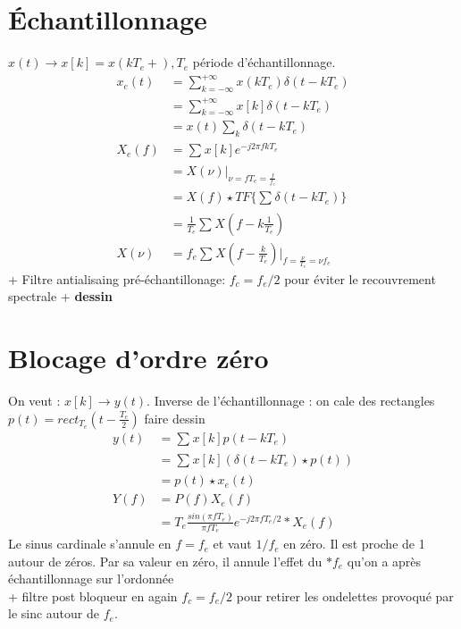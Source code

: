 \documentclass{article}
\begin{document}
\begin{multicols}{2}
    \section{Échantillonnage}
    $ x(t) \to x[k] = x(kT_e+), T_e $  période d'échantillonnage. \\
    \begin{align*}
        x_e(t)  &= \sum_{k=-\infty }^{+\infty }x(kT_e)\delta (t - kT_e) \\
                &= \sum_{k=-\infty }^{+\infty }x[k]\delta (t - kT_e) \\
                &= x(t) \sum_{k}^{}\delta (t - kT_e)\\
        X_e(f)  &= \sum_{}^{} x[k] e^{- j 2 \pi fkT_e} \\
                &= X(\nu ) \vert _{\nu = fT_e = \frac{f}{f_e}} \\
                &= X(f) \star TF\{\sum_{}^{} \delta (t - kT_e)\} \\
                &= \frac{1}{T_e} \sum_{}^{}X(f - k \frac{1}{T_e}) \\
        X(\nu ) &= f_e \sum_{}^{}X(f - \frac{k}{T_e}) \vert _{f = \frac{\nu}{T_e} = \nu f_e}
    \end{align*}
    + Filtre antialisaing pré-échantillonage: $ f_c = f_e / 2 $ pour éviter le recouvrement spectrale + \textbf{dessin}
    
    \section{Blocage d'ordre zéro}
    On veut : $ x[k] \to y(t) $. Inverse de l'échantillonnage : on cale des rectangles $ p(t) = rect_{T_e} (t - \frac{T_e}{2}) $ faire dessin
    \begin{align*}
        y(t)&= \sum_{}^{}x[k]p(t - kT_e) \\
            &= \sum_{}^{}x[k](\delta (t - kT_e) \star p(t)) \\
            &= p(t) \star x_e(t) \\
        Y(f)&= P(f)X_e(f) \\
            &= T_e \frac{sin(\pi f T_e)}{\pi f T_e} e^{-j 2 \pi f T_e/2} * X_e(f)
    \end{align*}
    Le sinus cardinale s'annule en $ f = f_e $ et vaut $ 1/f_e $ en zéro. Il est proche de 1 autour de zéros. Par sa valeur en zéro, il annule l'effet du $ *f_e $ qu'on a après échantillonnage sur l'ordonnée\\
    + filtre post bloqueur en again $ f_c = f_e/2 $ pour retirer les ondelettes provoqué par le sinc autour de $ f_e $. 
    

\end{multicols}
\end{document}
